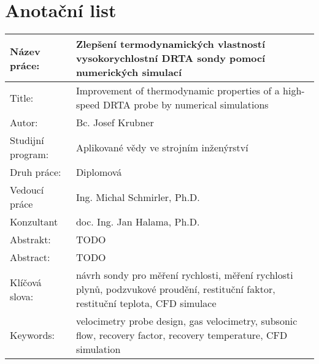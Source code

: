 \thispagestyle{empty}
\section*{Anotační list}
\def\arraystretch{2}%
\begin{table}[ht!]
    \centering
    \begin{tabular}{p{}|p{}}
    Název práce: & Zlepšení termodynamických vlastností vysokorychlostní DRTA sondy pomocí numerických simulací \\ \hline
    Title: & Improvement of thermodynamic properties of a high-speed DRTA probe by numerical simulations \\ \hline
    Autor: & Bc. Josef Krubner \\ \hline
    Studijní program: & Aplikované vědy ve strojním inženýrství \\ \hline
    Druh práce: & Diplomová \\ \hline
    Vedoucí práce & Ing. Michal Schmirler, Ph.D. \\ \hline
    Konzultant & doc. Ing. Jan Halama, Ph.D. \\ \hline
    Abstrakt: & TODO \\ \hline
    Abstract: & TODO \\ \hline
    Klíčová slova: & návrh sondy pro měření rychlosti, měření rychlosti plynů, podzvukové proudění, restituční faktor, restituční teplota, CFD simulace\\ \hline
    Keywords: & velocimetry probe design, gas velocimetry, subsonic flow, recovery factor, recovery temperature, CFD simulation
    \end{tabular}
\end{table}
\def\arraystretch{1}%